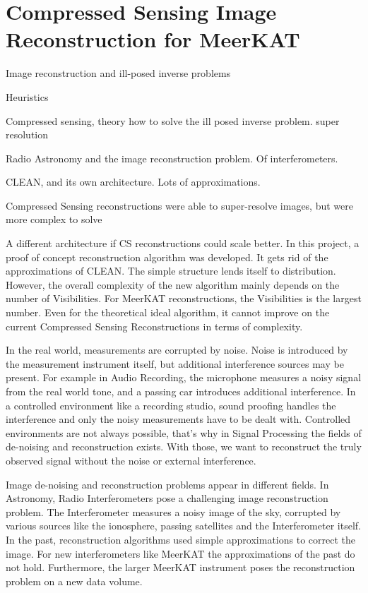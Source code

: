 \section{Compressed Sensing Image Reconstruction for MeerKAT} \label{intro}
Image reconstruction and ill-posed inverse problems

Heuristics

Compressed sensing, theory how to solve the ill posed inverse problem. super resolution

Radio Astronomy and the image reconstruction problem. Of interferometers.

CLEAN, and its own architecture. Lots of approximations.

Compressed Sensing reconstructions were able to super-resolve images, but were more complex to solve

A different architecture if CS reconstructions could scale better. In this project, a proof of concept reconstruction algorithm was developed. It gets rid of the approximations of CLEAN. The simple structure lends itself to distribution. However, the overall complexity of the new algorithm mainly depends on the number of Visibilities. For MeerKAT reconstructions, the Visibilities is the largest number. Even for the theoretical ideal algorithm, it cannot improve on the current Compressed Sensing Reconstructions in terms of complexity. 



In the real world, measurements are corrupted by noise. Noise is introduced by the measurement instrument itself, but additional interference sources may be present. For example in Audio Recording, the microphone measures a noisy signal from the real world tone, and a passing car introduces additional interference. In a controlled environment like a recording studio, sound proofing handles the interference and only the noisy measurements have to be dealt with. Controlled environments are not always possible, that's why in Signal Processing the fields of de-noising and reconstruction exists. With those, we want to reconstruct the truly observed signal without the noise or external interference.

Image de-noising and reconstruction problems appear in different fields. In Astronomy, Radio Interferometers pose a challenging image reconstruction problem. The Interferometer measures a noisy image of the sky, corrupted by various sources like the ionosphere, passing satellites and the Interferometer itself. In the past, reconstruction algorithms used simple approximations to correct the image. For new interferometers like MeerKAT the approximations of the past do not hold. Furthermore, the larger MeerKAT instrument poses the reconstruction problem on a new data volume.

